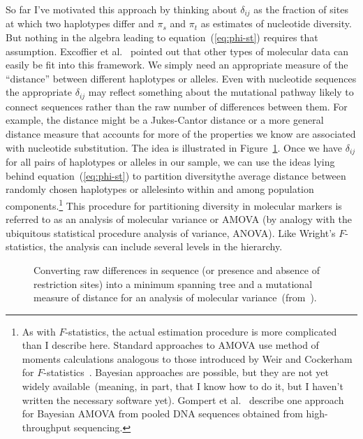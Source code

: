 So far I've motivated this approach by thinking about $\delta_{ij}$ as
the fraction of sites at which two haplotypes differ and $\pi_s$ and
$\pi_t$ as estimates of nucleotide diversity. But nothing in the
algebra leading to equation~(\ref{eq:phi-st}) requires that
assumption. Excoffier et al.~\cite{Excoffier-etal92} pointed out that
other types of molecular data can easily be fit into this
framework. We simply need an appropriate measure of the ``distance''
between different haplotypes or alleles. Even with nucleotide
sequences the appropriate $\delta_{ij}$ may reflect something about
the mutational pathway likely to connect sequences rather than the raw
number of differences between them. For example, the distance might be
a Jukes-Cantor distance or a more general distance measure that
accounts for more of the properties we know are associated with
nucleotide substitution. The idea is illustrated in
Figure~\ref{fig:amova-procedure}. Once we have $\delta_{ij}$ for all
pairs of haplotypes or alleles in our sample, we can use the ideas
lying behind equation~(\ref{eq:phi-st}) to partition
diversity{\dash}the average distance between randomly chosen
haplotypes or alleles{\dash}into within and among population
components.\footnote{As with $F$-statistics, the actual estimation
  procedure is more complicated than I describe here. Standard
  approaches to AMOVA use method of moments calculations analogous to
  those introduced by Weir and Cockerham for
  $F$-statistics~\cite{WeirCockerham84}. Bayesian approaches are
  possible, but they are not yet widely available~(meaning, in part,
  that I know how to do it, but I haven't written the necessary
  software yet). Gompert et al.~\cite{Gompert-etal-2010} describe one
  approach for Bayesian AMOVA from pooled DNA sequences obtained from
  high-throughput sequencing.} This procedure for partitioning
diversity in molecular markers is referred to as an analysis of
molecular variance or AMOVA (by analogy with the ubiquitous
statistical procedure analysis of variance, ANOVA). Like Wright's
$F$-statistics, the analysis can include several levels in the
hierarchy.

\begin{figure}
\begin{center}
\end{center}
\caption{Converting raw differences in sequence (or presence and
  absence of restriction sites) into a minimum spanning tree and a
  mutational measure of distance for an analysis of molecular variance~(from~\cite{Excoffier-etal92}).}\label{fig:amova-procedure}
\end{figure}

